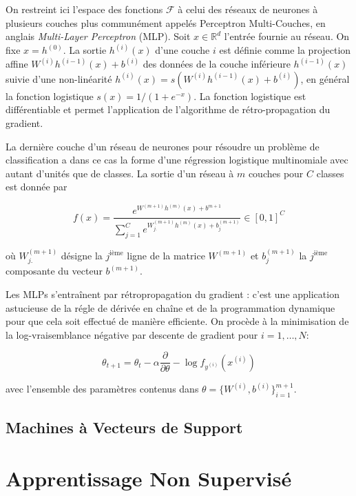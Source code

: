 On restreint ici l'espace des fonctions $\mathcal{F}$ à celui des réseaux de
neurones à plusieurs couches plus communément appelés Perceptron Multi-Couches,
en anglais \textit{Multi-Layer Perceptron} (MLP)\citep{Rosenblatt-1958}. Soit
$x\in\mathbb{R}^d$ l'entrée fournie au réseau. On fixe $x=h^{(0)}$. La sortie
$h^{(i)}(x)$ d'une couche $i$ est définie comme la projection affine
$W^{(i)}h^{(i-1)}(x) + b^{(i)}$ des données de la couche inférieure $h^{(i-1)}(x)$
suivie d'une non-linéarité $h^{(i)}(x)= s(W^{(i)}h^{(i-1)}(x) + b^{(i)})$, en
général la fonction logistique $s(x)=1/(1+e^{-x})$. La fonction logistique est différentiable et
permet l'application de l'algorithme de rétro-propagation du gradient. 

La dernière couche d'un réseau de neurones pour résoudre un problème de
classification a dans ce cas la forme d'une régression logistique multinomiale
avec autant d'unités que de classes. La sortie d'un réseau à $m$ couches pour
$C$ classes est donnée par

\begin{equation}
\label{eq:softmax}
f(x) = \frac{e^{W^{(m+1)} h^{(m)}(x) + b^{m+1}}}{\sum_{j=1}^C e^{W^{(m+1)}_{j.} h^{(m)}(x) + b^{(m+1)}_{j} }} \in [0,1]^{C}
\end{equation}

où $W_{j.}^{(m+1)}$ désigne la $j^\textrm{ième}$ ligne de la matrice $W^{(m+1)}$
et $b_{j}^{(m+1)}$ la $j^\textrm{ième}$ composante du vecteur $b^{(m+1)}$.

Les MLPs s'entraînent par rétropropagation du gradient \citep{Rumelhart86b}:
c'est une application astucieuse de la régle de dérivée en chaîne et de la
programmation dynamique pour que cela soit effectué de manière efficiente. On
procède à la minimisation de la log-vraisemblance négative par descente de
gradient pour $i=1,\dots,N$:

\begin{equation}
\theta_{t+1} = \theta_{t} - \alpha \dfrac{\partial}{\partial\theta} -\log f_{y^{(i)}}(x^{(i)})
\end{equation}

avec l'ensemble des paramètres contenus dans $\theta=\lbrace W^{(i)},b^{(i)}\rbrace_{i=1}^{m+1}$.

\subsection{Machines à Vecteurs de Support}



\section{Apprentissage Non Supervisé}


